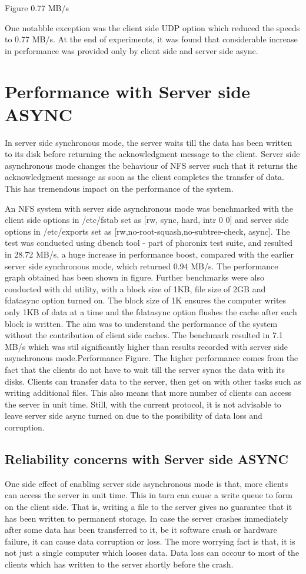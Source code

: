 \documentclass[conference]{IEEEtran}
\begin{document}
Figure 0.77 MB/s

One notabble
exception was the client side UDP option which reduced the speeds to
0.77 MB/s. At the end of experiments, it was found that considerable 
increase in performance was provided only by client side and server side 
async.


\section{Performance with Server side ASYNC}
In server side synchronous mode, the server waits till the data has been 
written to its disk before returning the acknowledgment message to the 
client. Server side asynchronous mode changes the behaviour of NFS server 
such that it returns the acknowledgment message as soon as the client 
completes the transfer of data. This has tremendous impact on the
performance of the system.

An NFS system with server side asynchronous mode was benchmarked with the
client side options in /etc/fstab set as [rw, sync, hard, intr 0 0] and
server side options in /etc/exports set as 
[rw,no-root-squash,no-subtree-check, async]. The test was conducted using
dbench tool - part of phoronix test suite, and resulted in 28.72 MB/s, a
huge increase in performance boost, compared with the earlier server side
synchronous mode, which returned 0.94 MB/s. The performance graph obtained has been shown in figure.
Further benchmarks were also conducted with dd utility, with a block size
of 1KB, file size of 2GB and fdatasync option turned on. The block size of
1K ensures the computer writes only 1KB of data at a time and the fdatasync
option flushes the cache after each block is written. The aim was to
understand the performance of the system without the contribution of client
side caches. The benchmark resulted in 7.1 MB/s which was stil significantly
higher than results recorded with server side asynchronous mode.Performance Figure.
The higher performance comes from the fact that the clients do not have to 
wait till the server syncs the data with its disks. Clients can transfer
data to the server, then get on with other tasks such as writing additional
files. This also means that more number of clients can access the server
in unit time. Still, with the current protocol, it is not advisable to leave
server side async turned on due to the possibility of data loss and
corruption.
\subsection{Reliability concerns with Server side ASYNC}\label{AA}
One side effect of enabling server side asynchronous mode is that, more
clients can access the server in unit time. This in turn can cause a write
queue to form on the client side. That is, writing a file to the server
gives no guarantee that it has been written to permanent storage. In case
the server crashes immediately after some data has been transferred to it,
be it software crash or hardware failure, it can cause data corruption or 
loss. The more worrying fact is that, it is not just a single computer which
looses data. Data loss can occour to most of the clients which has written 
to the server shortly before the crash.
\end{document}

